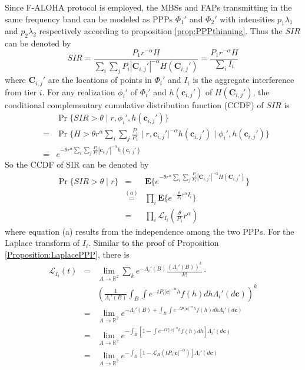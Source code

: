 \documentclass[a4paper,twocolumn]{IEEEtran}
\begin{document}
Since F-ALOHA protocol is employed, the MBSs and FAPs transmitting in the same frequency band can be modeled as PPPs $\Phi_1'$ and $\Phi_2'$ with intensities $p_1\lambda_1$ and $p_2\lambda_2$ respectively according to proposition \ref{prop:PPPthinning}. Thus the $SIR$ can be denoted by
\begin{equation}
SIR = \frac{P_1 r^{-\alpha} H}{\sum_i\sum_j P_i | \bm{C}_{i,j}' |^{-\alpha} H(\bm{C}_{i,j}')}=\frac{P_1 r^{-\alpha} H}{\sum_i I_i}
\end{equation}
where $\bm{C}_{i,j}'$ are the locations of points in $\Phi_i'$ and  $I_i$ is the aggregate interference from tier $i$. For any realization $\phi_i'$ of $\Phi_i'$ and $h(\bm{c}_{i,j}')$ of $H(\bm{C}_{i,j}')$, the conditional complementary cumulative distribution function (CCDF) of $SIR$ is
\begin{eqnarray}
&&\Pr\{SIR > \theta \mid r, \phi_i',h(\bm{c}_{i,j}') \}\nonumber\\
&=& \Pr \{ H > \theta r^{\alpha} {\sum_i\sum_j \frac{P_i}{P_1} \mid r, \bm{c}_{i,j}' |^{-\alpha} h(\bm{c}_{i,j}')} \mid \phi_i',h(\bm{c}_{i,j}') \} \nonumber\\
&=& e^{-\theta r^{\alpha} {\sum_i\sum_j \frac{P_i}{P_1} | \bm{c}_{i,j}' |^{-\alpha} h(\bm{c}_{i,j}')}}
\end{eqnarray}
So the CCDF of SIR can be denoted by
\begin{eqnarray}
\Pr\{SIR > \theta \mid r\}&=&\mathbf{E}\{ e^{-\theta r^{\alpha} {\sum_i\sum_j \frac{P_i}{P_1} | \bm{C}_{i,j}' |^{-\alpha} H(\bm{C}_{i,j}')}} \} \nonumber\\
&\stackrel{(a)}{=}&\prod_{i} \mathbf{E} \{ e^{- \frac{\theta}{P_1} r^{\alpha} I_i} \} \nonumber\\
&=&\prod_{i} \mathcal{L}_{I_i} (\frac{\theta}{P_1} r^{\alpha})
\end{eqnarray}
where equation (a) results from the independence among the two PPPs. For the Laplace transform of $I_i$. Similar to the proof of Proposition \ref{Proposition:LaplacePPP}, there is
\begin{eqnarray}\label{Eq:Lap_Intf}
\mathcal{L}_{I_i} (t) &=&\lim_{A \rightarrow \mathbb{R}^2} \sum_k e^{-\Lambda_i' (B)} \frac{(\Lambda_i' (B))^k}{k!}\cdot \nonumber\\
&&(\frac{1}{\Lambda_i' (B)}\int_{B}\int e^{-t P_i |\bm{c}|^{-\alpha} h}f(h) dh \Lambda_i'(d\bm{c}))^k \nonumber\\
&=&\lim_{A \rightarrow \mathbb{R}^2} e^{-\Lambda_i' (B)+\int_{B}\int e^{-t P_i |\bm{c}|^{-\alpha} h}f(h) dh \Lambda_i'(d\bm{c})}\nonumber\\
&=&\lim_{A \rightarrow \mathbb{R}^2}  e^{-\int_{B}[1-\int e^{-t P_i |\bm{c}|^{-\alpha} h}f(h) dh] \Lambda_i'(d\bm{c})}\nonumber\\
&=&\lim_{A \rightarrow \mathbb{R}^2}  e^{-\int_{B}[1-\mathcal{L}_H (t P_i |\bm{c}|^{-\alpha})] \Lambda_i'(d\bm{c})}
\end{eqnarray}
\end{document}
